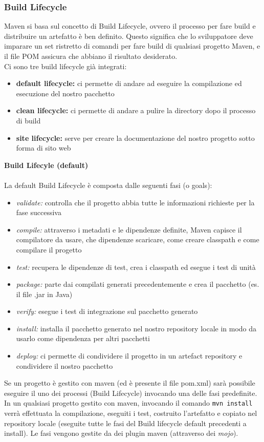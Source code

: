 \documentclass[10pt, a4paper]{article}
\begin{document}
\subsubsection{Build Lifecycle}
Maven si basa sul concetto di Build Lifecycle, ovvero il processo per fare build e distribuire un artefatto è ben definito. Questo significa che lo sviluppatore deve imparare un set ristretto di comandi per fare build di qualsiasi progetto Maven, e il file POM assicura che abbiano il risultato desiderato.\\
Ci sono tre build lifecycle già integrati:
\begin{itemize}
    \item \textbf{default lifecycle:} ci permette di andare ad eseguire la compilazione ed esecuzione del nostro pacchetto
    \item \textbf{clean lifecycle:} ci permette di andare a pulire la directory dopo il processo di build
    \item \textbf{site lifecycle:} serve per creare la documentazione del nostro progetto sotto forma di sito web
\end{itemize}
\textbf{Build Lifecyle (default)}\\\\
La default Build Lifecycle è composta dalle seguenti fasi (o goals):
\begin{itemize}
    \item \textit{validate:} controlla che il progetto abbia tutte le informazioni richieste per la fase successiva
    \item \textit{compile:} attraverso i metadati e le dipendenze definite, Maven capisce il compilatore da usare, che dipendenze scaricare, come creare classpath e come compilare il progetto
    \item \textit{test:} recupera le dipendenze di test, crea i classpath ed esegue i test di unità
    \item \textit{package:} parte dai compilati generati precedentemente e crea il pacchetto (es. il file .jar in Java)
    \item \textit{verify:} esegue i test di integrazione sul pacchetto generato
    \item \textit{install:} installa il pacchetto generato nel nostro repository locale in modo da usarlo come dipendenza per altri pacchetti
    \item \textit{deploy:} ci permette di condividere il progetto in un artefact repository e condividere il nostro pacchetto
\end{itemize}
Se un progetto è gestito con maven (ed è presente il file pom.xml) sarà possibile
eseguire il uno dei processi (Build Lifecycle) invocando una delle fasi predefinite.\\
In un qualsiasi progetto gestito con maven, invocando il comando
\verb|mvn install|
verrà effettuata la compilazione, eseguiti i test, costruito l’artefatto e copiato nel
repository locale (eseguite tutte le fasi del Build lifecycle default precedenti a install).
Le fasi vengono gestite da dei plugin maven (attraverso dei \textit{mojo}).
\end{document}
